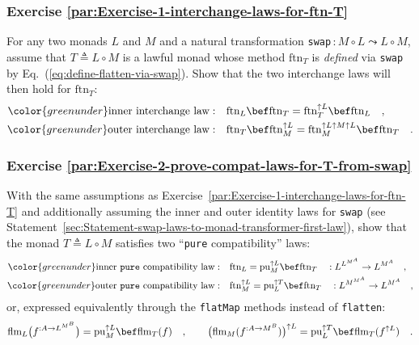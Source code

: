 \subsubsection{Exercise \label{par:Exercise-1-interchange-laws-for-ftn-T}\ref{par:Exercise-1-interchange-laws-for-ftn-T}}

For any two monads $L$ and $M$ and a natural transformation \lstinline!swap!$\,:M\circ L\leadsto L\circ M$,
assume that $T\triangleq L\circ M$ is a lawful monad whose method
$\text{ftn}_{T}$ is \emph{defined} via \lstinline!swap! by Eq.~(\ref{eq:define-flatten-via-swap}).
Show that the two interchange laws will then hold for $\text{ftn}_{T}$:
\begin{align*}
{\color{greenunder}\text{inner interchange law}:}\quad & \text{ftn}_{L}\bef\text{ftn}_{T}=\text{ftn}_{T}^{\uparrow L}\bef\text{ftn}_{L}\quad,\\
{\color{greenunder}\text{outer interchange law}:}\quad & \text{ftn}_{T}\bef\text{ftn}_{M}^{\uparrow L}=\text{ftn}_{M}^{\uparrow L\uparrow M\uparrow L}\bef\text{ftn}_{T}\quad.
\end{align*}


\subsubsection{Exercise \label{par:Exercise-2-prove-compat-laws-for-T-from-swap}\ref{par:Exercise-2-prove-compat-laws-for-T-from-swap}}

With the same assumptions as Exercise~\ref{par:Exercise-1-interchange-laws-for-ftn-T}
and additionally assuming the inner and outer identity laws for \lstinline!swap!
(see Statement~\ref{sec:Statement-swap-laws-to-monad-transformer-first-law}),
show that the monad $T\triangleq L\circ M$ satisfies two \textsf{``}\lstinline!pure!
compatibility\textsf{''} laws:
\begin{align*}
{\color{greenunder}\text{inner \texttt{pure} compatibility law}:}\quad & \text{ftn}_{L}=\text{pu}_{M}^{\uparrow L}\bef\text{ftn}_{T}\quad:L^{L^{M^{A}}}\rightarrow L^{M^{A}}\quad,\\
{\color{greenunder}\text{outer \texttt{pure} compatibility law}:}\quad & \text{ftn}_{M}^{\uparrow L}=\text{pu}_{L}^{\uparrow T}\bef\text{ftn}_{T}\quad:L^{M^{M^{A}}}\rightarrow L^{M^{A}}\quad,
\end{align*}
or, expressed equivalently through the \lstinline!flatMap! methods
instead of \lstinline!flatten!:
\[
\text{flm}_{L}\big(f^{:A\rightarrow L^{M^{B}}}\big)=\text{pu}_{M}^{\uparrow L}\bef\text{flm}_{T}(f)\quad,\quad\quad\big(\text{flm}_{M}(f^{:A\rightarrow M^{B}})\big)^{\uparrow L}=\text{pu}_{L}^{\uparrow T}\bef\text{flm}_{T}(f^{\uparrow L})\quad.
\]


